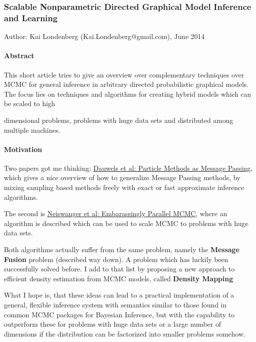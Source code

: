 \subsubsection{Scalable Nonparametric Directed Graphical Model Inference
and Learning}

Author: Kai Londenberg (Kai.Londenberg@gmail.com), June 2014

\paragraph{Abstract}

This short article tries to give an overview over complementary
techniques over MCMC for general inference in arbitrary directed
probabilistic graphical models. The focus lies on techniques and
algorithms for creating hybrid models which can be scaled to high

dimensional problems, problems with huge data sets and distributed among
multiple machines.

\paragraph{Motivation}

Two papers got me thinking:
\href{http://www.dauwels.com/Papers/Particle.pdf}{Dauwels et al:
Particle Methods as Message Passing}, which gives a nice overview of how
to generalize Message Passing methods, by mixing sampling based methods
freely with exact or fast approximate inference algorithms.

The second is \href{http://arxiv.org/pdf/1311.4780v1.pdf}{Neiswanger et
al: Embarassingly Parallel MCMC}, where an algorithm is described which
can be used to scale MCMC to problems with huge data sets.

Both algorithms actually suffer from the same problem, namely the
\textbf{Message Fusion} problem (described way down). A problem which
has luckily been successfully solved before. I add to that list by
proposing a new approach to efficient density estimation from MCMC
models, called \textbf{Density Mapping}

What I hope is, that these ideas can lead to a practical implementation
of a general, flexible inference system with semantics similar to those
found in common MCMC packages for Bayesian Inference, but with the
capability to outperform these for problems with huge data sets or a
large number of dimensions if the distribution can be factorized into
smaller problems somehow.

